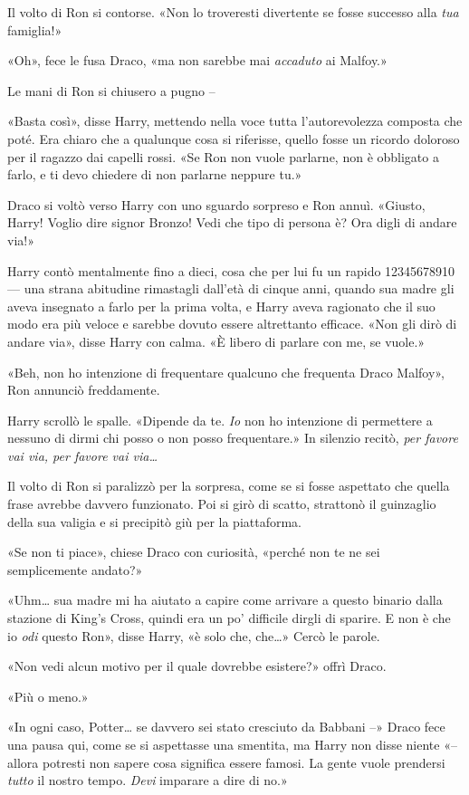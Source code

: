 Il volto di Ron si contorse. «Non lo troveresti divertente se fosse successo alla \textit{tua} famiglia!»

«Oh», fece le fusa Draco, «ma non sarebbe mai \textit{accaduto} ai Malfoy.»

Le mani di Ron si chiusero a pugno –

«Basta così», disse Harry, mettendo nella voce tutta l’autorevolezza composta che poté. Era chiaro che a qualunque cosa si riferisse, quello fosse un ricordo doloroso per il ragazzo dai capelli rossi. «Se Ron non vuole parlarne, non è obbligato a farlo, e ti devo chiedere di non parlarne neppure tu.»

Draco si voltò verso Harry con uno sguardo sorpreso e Ron annuì. «Giusto, Harry! Voglio dire signor Bronzo! Vedi che tipo di persona è? Ora digli di andare via!»

Harry contò mentalmente fino a dieci, cosa che per lui fu un rapido 12345678910 — una strana abitudine rimastagli dall’età di cinque anni, quando sua madre gli aveva insegnato a farlo per la prima volta, e Harry aveva ragionato che il suo modo era più veloce e sarebbe dovuto essere altrettanto efficace. «Non gli dirò di andare via», disse Harry con calma. «È libero di parlare con me, se vuole.»

«Beh, non ho intenzione di frequentare qualcuno che frequenta Draco Malfoy», Ron annunciò freddamente.

Harry scrollò le spalle. «Dipende da te. \textit{Io} non ho intenzione di permettere a nessuno di dirmi chi posso o non posso frequentare.» In silenzio recitò, \textit{per favore vai via, per favore vai via…}

Il volto di Ron si paralizzò per la sorpresa, come se si fosse aspettato che quella frase avrebbe davvero funzionato. Poi si girò di scatto, strattonò il guinzaglio della sua valigia e si precipitò giù per la piattaforma.

«Se non ti piace», chiese Draco con curiosità, «perché non te ne sei semplicemente andato?»

«Uhm… sua madre mi ha aiutato a capire come arrivare a questo binario dalla stazione di King’s Cross, quindi era un po’ difficile dirgli di sparire. E non è che io \textit{odi} questo Ron», disse Harry, «è solo che, che…» Cercò le parole.

«Non vedi alcun motivo per il quale dovrebbe esistere?» offrì Draco.

«Più o meno.»

«In ogni caso, Potter… se davvero sei stato cresciuto da Babbani –» Draco fece una pausa qui, come se si aspettasse una smentita, ma Harry non disse niente «– allora potresti non sapere cosa significa essere famosi. La gente vuole prendersi \textit{tutto} il nostro tempo. \textit{Devi} imparare a dire di no.»

